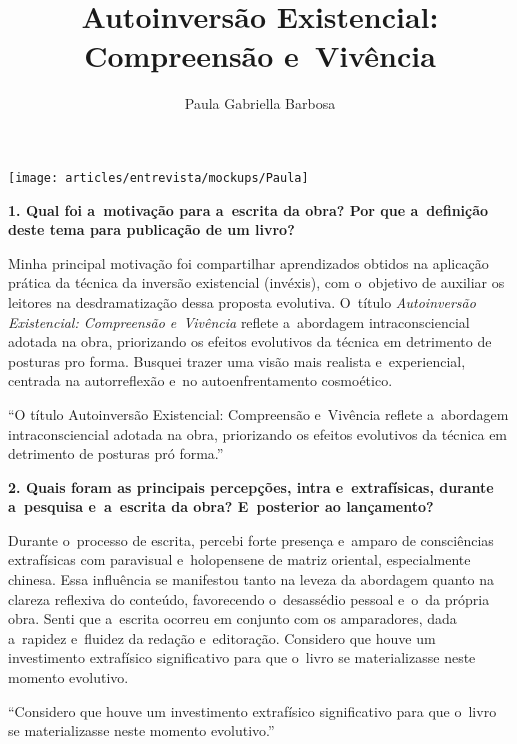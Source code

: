 \documentclass{gescons}
\author{Paula Gabriella Barbosa}
\title{Autoinversão Existencial: Compreensão e~Vivência}
\begin{document}
    \makeentrevistatitle

    \begin{multicols}{2}



\begin{center}
    \texttt{[image: articles/entrevista/mockups/Paula]}
\end{center}


\textbf{1. Qual foi a~motivação para a~escrita da obra? Por que a~definição deste tema para publicação de um livro?}

Minha principal motivação foi compartilhar aprendizados obtidos na aplicação prática da técnica da inversão existencial (invéxis), com o~objetivo de auxiliar os leitores na desdramatização dessa proposta evolutiva. O~título \textit{Autoinversão Existencial: Compreensão e~Vivência} reflete a~abordagem intraconsciencial adotada na obra, priorizando os efeitos evolutivos da técnica em detrimento de posturas pro forma. Busquei trazer uma visão mais realista e~experiencial, centrada na autorreflexão e~no autoenfrentamento cosmoético.

\begin{pullquote}
    ``O título Autoinversão Existencial: Compreensão e~Vivência reflete a~abordagem intraconsciencial adotada na obra, priorizando os efeitos evolutivos da técnica em detrimento de posturas pró forma.''
\end{pullquote}

\textbf{2. Quais foram as principais percepções, intra e~extrafísicas, durante a~pesquisa e~a~escrita da obra? E~posterior ao lançamento?}

Durante o~processo de escrita, percebi forte presença e~amparo de consciências extrafísicas com paravisual e~holopensene de matriz oriental, especialmente chinesa. Essa influência se manifestou tanto na leveza da abordagem quanto na clareza reflexiva do conteúdo, favorecendo o~desassédio pessoal e~o~da própria obra. Senti que a~escrita ocorreu em conjunto com os amparadores, dada a~rapidez e~fluidez da redação e~editoração. Considero que houve um investimento extrafísico significativo para que o~livro se materializasse neste momento evolutivo.

\begin{pullquote}
    ``Considero que houve um investimento extrafísico significativo para que o~livro se materializasse neste momento evolutivo.''
\end{pullquote}


\end{multicols}
\end{document}
